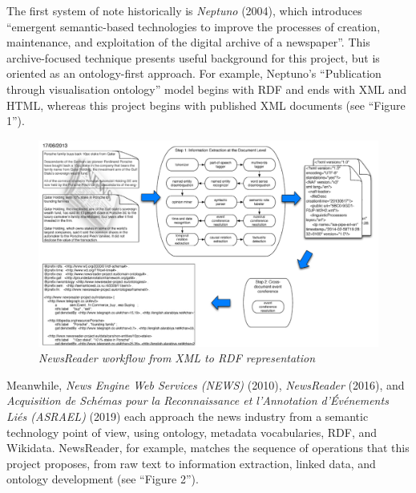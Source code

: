 \documentclass[11pt]{article}
\begin{document}
  The first system of note historically is \textit{Neptuno} (2004)\cite{castells2004neptuno}, which introduces ``emergent semantic-based technologies to improve the processes of creation, maintenance, and exploitation of the digital archive of a newspaper''. This archive-focused technique presents useful background for this project, but is oriented as an ontology-first approach. For example, Neptuno's ``Publication through visualisation ontology'' model begins with RDF and ends with XML and HTML, whereas this project begins with published XML documents (see ``Figure 1'').

  \begin{figure}
    \centerline{\includegraphics[scale=0.4]{literature-review--newsreader.png}}
    \caption{\textit{NewsReader workflow from XML to RDF representation}}
  \end{figure}

  Meanwhile, \textit{News Engine Web Services (NEWS)} \cite{fernandez2010news} (2010), \textit{NewsReader} \cite{vossen2016newsreader} (2016), and \textit{Acquisition de Schémas pour la Reconnaissance et l'Annotation d'Événements Liés (ASRAEL)} \cite{rudnik2019searching} (2019) each approach the news industry from a semantic technology point of view, using ontology, metadata vocabularies, RDF, and Wikidata. NewsReader, for example, matches the sequence of operations that this project proposes, from raw text to information extraction, linked data, and ontology development (see ``Figure 2'').
\end{document}
